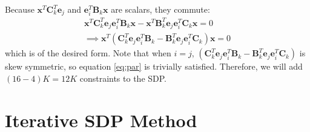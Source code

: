 \documentclass{article}
\begin{document}
Because $\mathbf{x}^T \mathbf{C}_k^T \mathbf{e}_j$ and $\mathbf{e}_i^T  \mathbf{B}_k \mathbf{x}$ are scalars, they commute:
\begin{align}
    \mathbf{x}^T \mathbf{C}_k^T \mathbf{e}_j \mathbf{e}_i^T  \mathbf{B}_k \mathbf{x} - \mathbf{x}^T \mathbf{B}_k^T \mathbf{e}_j \mathbf{e}_i^T  \mathbf{C}_k \mathbf{x} = 0 \\
    \implies
    \mathbf{x}^T (\mathbf{C}_k^T \mathbf{e}_j \mathbf{e}_i^T  \mathbf{B}_k - \mathbf{B}_k^T \mathbf{e}_j \mathbf{e}_i^T \mathbf{C}_k) \mathbf{x} = 0 \label{eq:par}
\end{align}
which is of the desired form. Note that when $i = j$, $(\mathbf{C}_k^T \mathbf{e}_j \mathbf{e}_i^T  \mathbf{B}_k - \mathbf{B}_k^T \mathbf{e}_j \mathbf{e}_i^T \mathbf{C}_k)$
is skew symmetric, so equation \ref{eq:par} is trivially satisfied. Therefore, we will add $(16 - 4)K = 12K$ constraints to the SDP.

\section{Iterative SDP Method}
\end{document}
